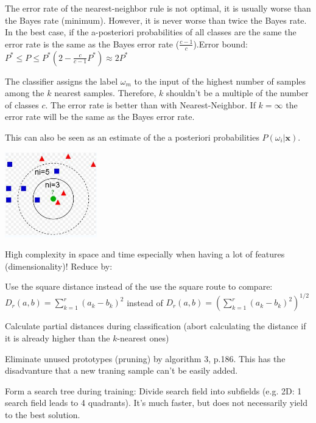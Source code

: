     The error rate of the nearest-neighbor rule is not optimal, it is usually worse than the Bayes 
    rate (minimum). However, it is never worse than twice the Bayes rate. 
    In the best case, if the a-posteriori probabilities of all classes are the same
    the error rate is the same as the Bayes error rate ($\frac{c-1}{c}$).\qquad Error bound: $P^*\leq P\leq P^*\left(2-\frac{c}{c-1}P^*\right)\approx 2P^*$ \\

  \begin{minipage}{14.5cm}
		The classifier assigns the label $\omega_m$ to the input of the highest number of samples among the $k$
		nearest samples. Therefore, $k$ shouldn't be a multiple of the number of classes $c$. 
		The error rate is better than with Nearest-Neighbor. If $k=\infty$
		the error rate will be the same as the Bayes error rate. 
		
		This can also be seen as an estimate of the a posteriori probabilities $P(\omega_i|\bm x)$.
		
  \end{minipage}
  \hfill
  \begin{minipage}{4cm}
	  	\includegraphics[width=4cm]{./images/kNearest.png}
  \end{minipage}
  
    High complexity in space and time especially when having a lot of features (dimensionality)!
    Reduce by: 
    \begin{aufzaehlung}
    	\item Use the square distance instead of the use the square route to compare: $D_r(a,b)=\sum\limits_{k=1}^r(a_k-b_k)^2$ 
    	instead of  $D_r(a,b)=\left(\sum\limits_{k=1}^r(a_k-b_k)^2\right)^{1/2}$
    	\item Calculate partial distances during classification (abort calculating the distance if it 
    	is already higher than the $k$-nearest ones)
    	\item Eliminate unused prototypes (pruning) by algorithm 3, p.186. This has the disadvanture that a new traning sample can't be easily added.
    	\item Form a search tree during training: Divide search field into subfields (e.g. 2D: 
    	1 search field leads to 4 quadrants). It's much faster, but does not necessarily yield to the best solution.
    \end{aufzaehlung}
  
